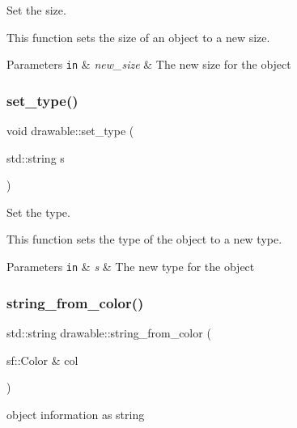 Set the size. 

This function sets the size of an object to a new size.


\begin{DoxyParams}[1]{Parameters}
\mbox{\tt in}  & {\em new\+\_\+size} & The new size for the object \\
\hline
\end{DoxyParams}
\mbox{\label{classdrawable_aa019787b726542ca470fb817251e7b09}} 
\subsubsection{\texorpdfstring{set\+\_\+type()}{set\_type()}}
{\footnotesize\ttfamily void drawable\+::set\+\_\+type (\begin{DoxyParamCaption}\item[{std\+::string}]{s }\end{DoxyParamCaption})}



Set the type. 

This function sets the type of the object to a new type.


\begin{DoxyParams}[1]{Parameters}
\mbox{\tt in}  & {\em s} & The new type for the object \\
\hline
\end{DoxyParams}
\mbox{\label{classdrawable_add3d8569fe2616ae0ed503b19c92c08e}} 
\subsubsection{\texorpdfstring{string\+\_\+from\+\_\+color()}{string\_from\_color()}}
{\footnotesize\ttfamily std\+::string drawable\+::string\+\_\+from\+\_\+color (\begin{DoxyParamCaption}\item[{sf\+::\+Color \&}]{col }\end{DoxyParamCaption})\hspace{0.3cm}{\ttfamily [virtual]}}



object information as string 

